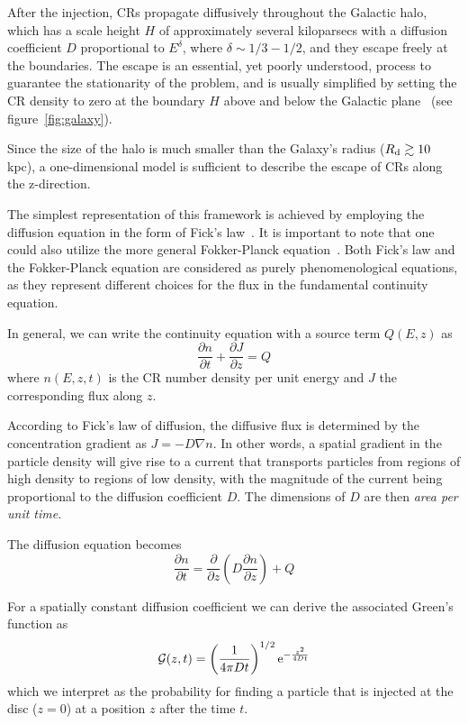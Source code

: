 After the injection, CRs propagate diffusively throughout the Galactic halo, which has a scale height $H$ of approximately several kiloparsecs with a diffusion coefficient $D$ proportional to $E^\delta$, where $\delta \sim 1/3 - 1/2$, and they escape freely at the boundaries. The escape is an essential, yet poorly understood, process to guarantee the stationarity of the problem, and is usually simplified by setting the CR density to zero at the boundary $H$ above and below the Galactic plane~\cite{Ginzburg1980apss} (see figure~\ref{fig:galaxy}).

Since the size of the halo is much smaller than the Galaxy's radius ($R_{\rm d} \gtrsim 10$ kpc), a one-dimensional model is sufficient to describe the escape of CRs along the z-direction.

The simplest representation of this framework is achieved by employing the diffusion equation in the form of Fick's law~\cite{Fick1855}. 
%
It is important to note that one could also utilize the more general Fokker-Planck equation~\cite{Mertschreview?}.
%
Both Fick's law and the Fokker-Planck equation are considered as purely phenomenological equations, as they represent different choices for the flux in the fundamental continuity equation.

In general, we can write the continuity equation with a source term $Q(E, z)$ as
%
\begin{equation}
\frac{\partial n}{\partial t} + \frac{\partial J}{\partial z} = Q
\end{equation}
%
where $n(E, z, t)$ is the CR number density per unit energy and $J$ the corresponding flux along $z$.

According to Fick's law of diffusion, the diffusive flux is determined by the concentration gradient as $J = -D \nabla n$. In other words, a spatial gradient in the particle density will give rise to a current that transports particles from regions of high density to regions of low density, with the magnitude of the current being proportional to the diffusion coefficient $D$. The dimensions of $D$ are then \emph{area per unit time}.

The diffusion equation becomes
%
\begin{equation}
\frac{\partial n}{\partial t} = \frac{\partial}{\partial z} \left( D\frac{\partial n}{\partial z} \right) + Q
\end{equation}

For a spatially constant diffusion coefficient we can derive the associated Green’s function as 
%
\begin{equation}
\mathcal G(z,t) = \left(\frac{1}{{4 \pi D t}}\right)^{1/2} {\rm e}^{-\frac{z^2}{4Dt}}
\label{eq:green}
\end{equation}
%
which we interpret as the probability for finding a particle that is injected at the disc ($z = 0$) at a position $z$ after the time $t$.

